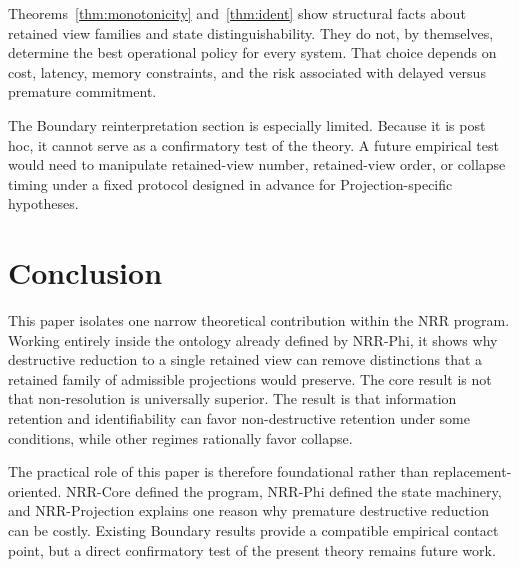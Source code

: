 \documentclass[11pt,a4paper]{article}
\begin{document}
Theorems~\ref{thm:monotonicity} and~\ref{thm:ident} show structural facts about retained view families and state distinguishability. They do not, by themselves, determine the best operational policy for every system. That choice depends on cost, latency, memory constraints, and the risk associated with delayed versus premature commitment.

The Boundary reinterpretation section is especially limited. Because it is post hoc, it cannot serve as a confirmatory test of the theory. A future empirical test would need to manipulate retained-view number, retained-view order, or collapse timing under a fixed protocol designed in advance for Projection-specific hypotheses.

\section{Conclusion}
\label{sec:conclusion}

This paper isolates one narrow theoretical contribution within the NRR program. Working entirely inside the ontology already defined by NRR-Phi, it shows why destructive reduction to a single retained view can remove distinctions that a retained family of admissible projections would preserve. The core result is not that non-resolution is universally superior. The result is that information retention and identifiability can favor non-destructive retention under some conditions, while other regimes rationally favor collapse.

The practical role of this paper is therefore foundational rather than replacement-oriented. NRR-Core defined the program, NRR-Phi defined the state machinery, and NRR-Projection explains one reason why premature destructive reduction can be costly. Existing Boundary results provide a compatible empirical contact point, but a direct confirmatory test of the present theory remains future work.
\end{document}
